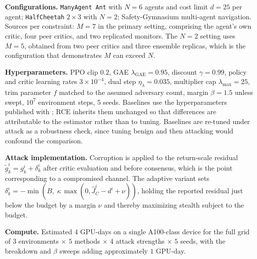 \documentclass{article}
\begin{document}
\textbf{Configurations.} \texttt{ManyAgent Ant} with $N=6$ agents and cost limit $d=25$ per agent; \texttt{HalfCheetah} $2\times3$ with $N=2$; Safety-Gymnasium multi-agent navigation. Sources per constraint: $M=7$ in the primary setting, comprising the agent's own critic, four peer critics, and two replicated monitors. The $N=2$ setting uses $M=5$, obtained from two peer critics and three ensemble replicas, which is the configuration that demonstrates $M$ can exceed $N$.

\textbf{Hyperparameters.} PPO clip $0.2$, GAE $\lambda_{\mathrm{GAE}}=0.95$, discount $\gamma=0.99$, policy and critic learning rates $3\times10^{-4}$, dual step $\eta_\lambda = 0.035$, multiplier cap $\lambda_{\max}=25$, trim parameter $f$ matched to the assumed adversary count, margin $\beta=1.5$ unless swept, $10^7$ environment steps, 5 seeds. Baselines use the hyperparameters published with \citet{gu2023macpo}; RCE inherits them unchanged so that differences are attributable to the estimator rather than to tuning. Baselines are re-tuned under attack as a robustness check, since tuning benign and then attacking would confound the comparison.

\textbf{Attack implementation.} Corruption is applied to the return-scale residual $\tilde g^i_k = g^i_k + \delta^i_k$ after critic evaluation and before consensus, which is the point corresponding to a compromised channel. The adaptive variant sets $\delta^i_k = -\min(B,\; \kappa\,\max(0, \hat J^i_C - d^i + \nu))$, holding the reported residual just below the budget by a margin $\nu$ and thereby maximizing stealth subject to the budget.

\textbf{Compute.} Estimated $4$ GPU-days on a single A100-class device for the full grid of $3$ environments $\times$ $5$ methods $\times$ $4$ attack strengths $\times$ $5$ seeds, with the breakdown and $\beta$ sweeps adding approximately $1$ GPU-day.
\end{document}

